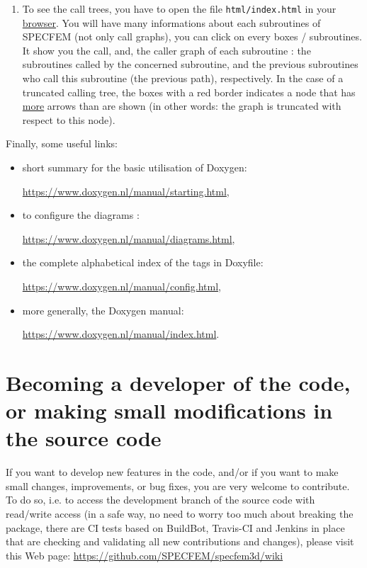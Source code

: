 \begin{enumerate}
\item To see the call trees, you have to open the file \texttt{html/index.html} in your \underline{browser}. You will have many informations about each subroutines of SPECFEM (not only call graphs), you can click on every boxes / subroutines. It show you the call, and, the caller graph of each subroutine : the subroutines called by the concerned subroutine, and the previous subroutines who call this subroutine (the previous path), respectively. In the case of a truncated calling tree, the boxes with a red border indicates a node that has \underline{more} arrows than are shown (in other words: the graph is truncated with respect to this node).

\end{enumerate}

\medskip

\noindent Finally, some useful links:

\begin{itemize}
\item[\textbullet] short summary for the basic utilisation of Doxygen:

\url{https://www.doxygen.nl/manual/starting.html},

\item[\textbullet] to configure the diagrams :

\url{https://www.doxygen.nl/manual/diagrams.html},

\item[\textbullet] the complete alphabetical index of the tags in Doxyfile:

\url{https://www.doxygen.nl/manual/config.html},

\item[\textbullet] more generally, the Doxygen manual:

\url{https://www.doxygen.nl/manual/index.html}.

\end{itemize}

\medskip


\section{Becoming a developer of the code, or making small modifications in the source code}

If you want to develop new features in the code, and/or if you want to make small changes, improvements, or bug fixes, you are very welcome to contribute. To do so, i.e. to access the development branch of the source code with read/write access (in a safe way, no need to worry too much about breaking the package, there are CI tests based on BuildBot, Travis-CI and Jenkins in place that are checking and validating all new contributions and changes), please visit this Web page:\newline
\url{https://github.com/SPECFEM/specfem3d/wiki}

